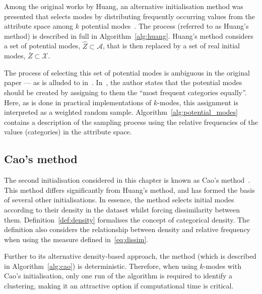 Among the original works by Huang, an alternative initialisation method was
presented that selects modes by distributing frequently occurring values from
the attribute space among \(k\) potential modes~\cite{Huang1998}. The process
(referred to as Huang's method) is described in full in
Algorithm~\ref{alg:huang}. Huang's method considers a set of potential modes,
\(\widehat Z \subset \mathcal A\), that is then replaced by a set of real
initial modes, \(\overline Z \subset \mathcal X\).

The process of selecting this set of potential modes is ambiguous in the
original paper --- as is alluded to in~\cite{Jiang2016}. In~\cite{Huang1998},
the author states that the potential modes should be created by assigning to
them the ``most frequent categories equally''. Here, as is done in practical
implementations of \(k\)-modes, this assignment is interpreted as a weighted
random sample. Algorithm~\ref{alg:potential_modes} contains a description of the
sampling process using the relative frequencies of the values (categories) in
the attribute space.



\subsection{Cao's method}\label{subsec:cao}

The second initialisation considered in this chapter is known as Cao's
method~\cite{Cao2009}. This method differs significantly from Huang's method,
and has formed the basis of several other initialisations. In essence, the
method selects initial modes according to their density in the dataset whilst
forcing dissimilarity between them. Definition~\ref{def:density} formalises the
concept of categorical density. The definition also considers the relationship
between density and relative frequency when using the measure defined
in~\eqref{eq:dissim}.

Further to its alternative density-based approach, the method (which is
described in Algorithm~\ref{alg:cao}) is deterministic. Therefore, when using
\(k\)-modes with Cao's initialisation, only one run of the algorithm is required
to identify a clustering, making it an attractive option if computational time
is critical.


